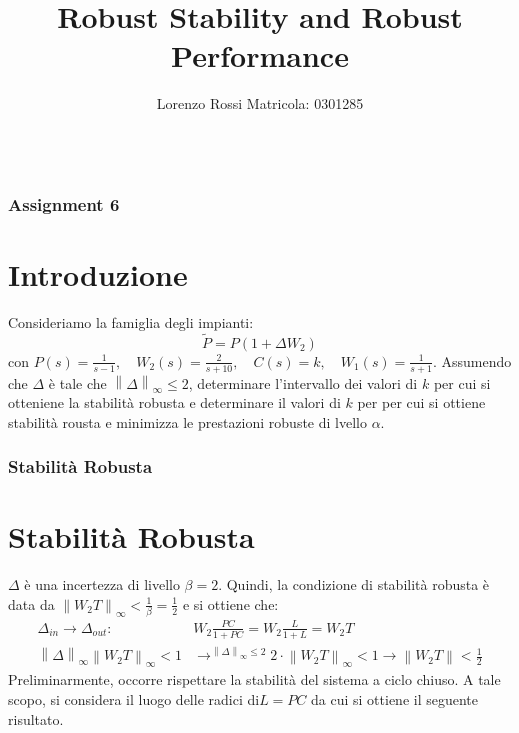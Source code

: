 \documentclass{beamer}
\title[Assignments 6]{Robust Stability and Robust Performance}
\author{Lorenzo Rossi Matricola: 0301285}
\begin{document}
\begin{frame}
	\titlepage{}
\end{frame}
\begin{frame}
	\begin{columns}[t]
		\begin{column}{.5\textwidth}
			\tableofcontents[sections={1-3}] %
		\end{column}
		\hspace{-1cm}
		\begin{column}{.5\textwidth}
			\tableofcontents[sections={4-5}] %
		\end{column}
	\end{columns}
\end{frame}
\begin{frame}
	\frametitle{Assignment 6}
	\section{Introduzione}
	Consideriamo la famiglia degli impianti:\begin{equation}
		\tilde{P}= P(1+\Delta W_{2})
	\end{equation}
	con \(P(s)=\frac{1}{s-1},\quad W_{2}(s)=\frac{2}{s+10},\quad C(s)=k,\quad W_{1}(s)=\frac{1}{s+1}\). Assumendo che \(\Delta \) è tale che \(\left\lVert \Delta\right\rVert_{\infty }\leq 2\), determinare l'intervallo dei valori di \(k\) per cui si otteniene la stabilità robusta e determinare il valori di \(k\) per per cui si ottiene stabilità rousta e minimizza le prestazioni robuste di lvello \(\alpha \).
\end{frame}
\begin{frame}
	\frametitle{Stabilità Robusta}%
	\section{Stabilità Robusta}
	\(\Delta \) è una incertezza di livello \(\beta = 2\). Quindi, la condizione di stabilità robusta è data da \(\left\lVert W_{2}T\right\rVert_{\infty}<\frac{1}{\beta}=\frac{1}{2}\) e si ottiene che:
	\begin{align*}
		\Delta_{in}\rightarrow \Delta_{out}: & W_{2}\frac{PC}{1+PC}=W_{2}\frac{L}{1+L}=W_{2}T                                  \\
		                                      \left\lVert \Delta\right\rVert_{\infty}\left\lVert W_{2}T\right\rVert_{\infty}<1&\longrightarrow^{\left\lVert \Delta\right\rVert_{\infty}\leq 2} 2\cdot\left\lVert W_{2}T\right\rVert_{\infty}<1\rightarrow \left\lVert W_{2}T\right\rVert<\frac{1}{2}
	\end{align*}
	Preliminarmente, occorre rispettare la stabilità del sistema a ciclo chiuso. A tale scopo, si considera il luogo delle radici di\(L=PC\) da cui si ottiene il seguente risultato.

\end{frame}
\end{document}
